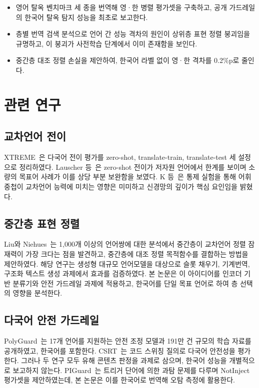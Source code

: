 \documentclass[twocolumn, 10pt]{article}
\begin{document}
\begin{itemize}
\item 영어 탈옥 벤치마크 세 종을 번역해 영·한 병렬 평가셋을 구축하고, 공개 가드레일의 한국어 탈옥 탐지 성능을 최초로 보고한다.
\item 층별 번역 검색 분석으로 언어 간 성능 격차의 원인이 상위층 표현 정렬 붕괴임을 규명하고, 이 붕괴가 사전학습 단계에서 이미 존재함을 보인다.
\item 중간층 대조 정렬 손실을 제안하여, 한국어 라벨 없이 영·한 격차를 0.2\%p로 줄인다.
\end{itemize}

\section{관련 연구}

\subsection{교차언어 전이}
XTREME~\cite{hu:icml2020}은 다국어 전이 평가를 zero-shot, translate-train, translate-test 세 설정으로 정리하였다.
Lauscher 등~\cite{lauscher:emnlp2020}은 zero-shot 전이가 저자원 언어에서 한계를 보이며 소량의 목표어 사례가 이를 상당 부분 보완함을 보였다.
K 등~\cite{k:iclr2020}은 통제 실험을 통해 어휘 중첩이 교차언어 능력에 미치는 영향은 미미하고 신경망의 깊이가 핵심 요인임을 밝혔다.

\subsection{중간층 표현 정렬}
Liu와 Niehues~\cite{liu:acl2025}는 1{,}000개 이상의 언어쌍에 대한 분석에서 중간층이 교차언어 정렬 잠재력이 가장 크다는 점을 발견하고, 중간층에 대조 정렬 목적함수를 결합하는 방법을 제안하였다.
해당 연구는 생성형 대규모 언어모델을 대상으로 슬롯 채우기, 기계번역, 구조화 텍스트 생성 과제에서 효과를 검증하였다.
본 논문은 이 아이디어를 인코더 기반 분류기와 안전 가드레일 과제에 적용하고, 한국어를 단일 목표 언어로 하여 층 선택의 영향을 분석한다.

\subsection{다국어 안전 가드레일}
PolyGuard~\cite{kumar:colm2025}는 17개 언어를 지원하는 안전 조정 모델과 191만 건 규모의 학습 자료를 공개하였고, 한국어를 포함한다.
CSRT~\cite{yoo:acl2025}는 코드 스위칭 질의로 다국어 안전성을 평가한다.
그러나 두 연구 모두 유해 콘텐츠 판정을 과제로 삼으며, 한국어 성능을 개별적으로 보고하지 않는다.
PIGuard~\cite{li:acl2025}는 트리거 단어에 의한 과탐 문제를 다루며 NotInject 평가셋을 제안하였는데, 본 논문은 이를 한국어로 번역해 오탐 측정에 활용한다.
\end{document}
